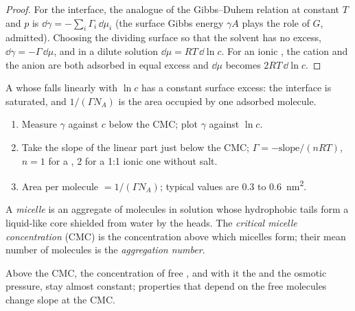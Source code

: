 \begin{proof}
For the interface, the analogue of the Gibbs--Duhem relation at constant $T$ and
$p$ is $\dd\gamma = -\sum_i\Gamma_i\,\dd\mu_i$ (the surface Gibbs energy $\gamma A$ plays the role of $G$,
admitted). Choosing the dividing surface so that the solvent has no excess,
$\dd\gamma = -\Gamma\,\dd\mu$, and in a dilute solution $\dd\mu = RT\,\dd\ln c$. For an ionic ,
the cation and the anion are both adsorbed in equal excess and $\dd\mu$ becomes
$2RT\,\dd\ln c$.
\end{proof}

A  whose  falls linearly with $\ln c$ has a constant
surface excess: the interface is saturated, and $1/(\Gamma N_A)$ is the area occupied by
one adsorbed molecule.

\begin{method}\label{met:b3:colloids:surface-excess}
\begin{enumerate}
  \item Measure $\gamma$ against $c$ below the CMC; plot $\gamma$ against $\ln c$.
  \item Take the slope of the linear part just below the CMC; $\Gamma = -\text{slope}/(nRT)$, $n
        = 1$ for a , 2 for a 1:1 ionic one without salt.
  \item Area per molecule $= 1/(\Gamma N_A)$; typical values are 0.3 to \qty{0.6}{nm^2}.
\end{enumerate}
\end{method}

\begin{definition}\label{def:b3:colloids:micelle}
A \emph{micelle} is an aggregate of  molecules in solution
whose hydrophobic tails form a liquid-like core shielded from water by the
heads. The \emph{critical micelle concentration}
(CMC) is the concentration above which micelles form; their
mean number of molecules is the \emph{aggregation number}.
\end{definition}

\begin{proposition}\label{prop:b3:colloids:cmc-break}
Above the CMC, the concentration of free , and with it the  and the osmotic pressure, stay almost constant; properties that depend
on the free molecules change slope at the CMC.
\end{proposition}

